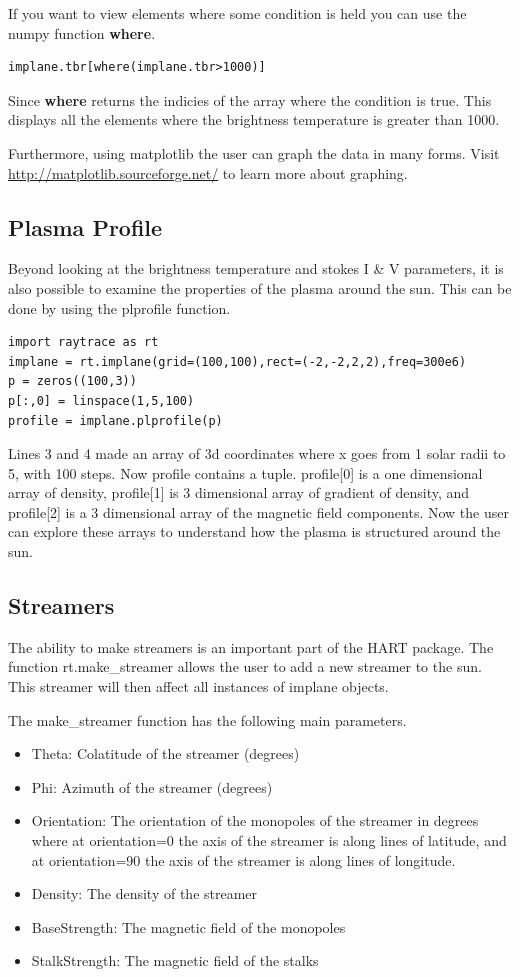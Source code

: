 \documentclass[12pt]{article}
\begin{document}
If you want to view elements where some condition is held you can use
the numpy function {\bf where}.

\begin{lstlisting}
implane.tbr[where(implane.tbr>1000)]
\end{lstlisting}
Since {\bf where} returns the indicies of the array where the
condition is true. This displays all the elements where the brightness 
temperature is greater than 1000. 

Furthermore, using matplotlib the user can graph the data in many
forms. Visit \url{http://matplotlib.sourceforge.net/} to
learn more about graphing.


\subsection{Plasma Profile}
Beyond looking at the brightness temperature and stokes I \& V
parameters, it is also possible to examine the properties of the
plasma around the sun. This can be done by using the plprofile
function.

\begin{lstlisting}
import raytrace as rt
implane = rt.implane(grid=(100,100),rect=(-2,-2,2,2),freq=300e6)
p = zeros((100,3))
p[:,0] = linspace(1,5,100)
profile = implane.plprofile(p)
\end{lstlisting}
Lines 3 and 4 made an array of 3d coordinates where x goes from 1
solar radii to 5, with 100 steps. Now profile contains a tuple. profile[0] is
a one dimensional array of density, profile[1] is 3 dimensional array of
gradient of density, and profile[2] is a 3 dimensional array of the magnetic
field components. Now the user can explore these arrays to understand
how the plasma is structured around the sun.

\subsection{Streamers}
The ability to make streamers is an important part of the HART
package. The function rt.make\_streamer allows the user to add a 
new streamer to the sun. This streamer will then affect all instances
of implane objects.

The make\_streamer function has the following main parameters.
\begin{itemize}
\item Theta: Colatitude of the streamer (degrees)
\item Phi: Azimuth of the streamer (degrees)
\item Orientation: The orientation of the monopoles of the streamer in
  degrees where at orientation=0 the axis of the streamer is
  along lines of latitude, and at orientation=90 the axis of
  the streamer is along lines of longitude.
\item Density: The density of the streamer
\item BaseStrength: The magnetic field of the monopoles
\item StalkStrength: The magnetic field of the stalks
\end{itemize}
\end{document}
